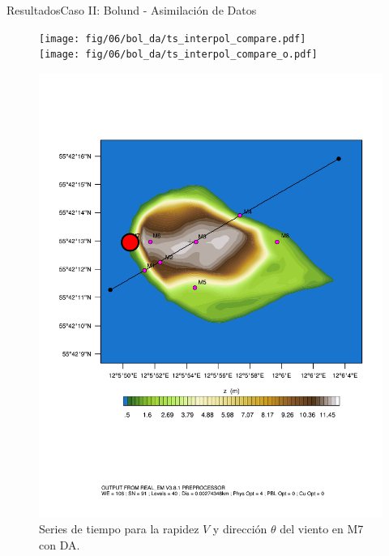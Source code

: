 \documentclass[mathserif,10pt]{beamer}
\begin{document}
\begin{frame}{Resultados}{Caso II: Bolund - Asimilación de Datos}
	\begin{figure}[H]
		\begin{minipage}{0.65\linewidth}
			\texttt{[image: fig/06/bol\_da/ts\_interpol\_compare.pdf]}\\%
			\texttt{[image: fig/06/bol\_da/ts\_interpol\_compare\_o.pdf]}%
		\end{minipage}%
		\begin{minipage}{0.35\linewidth}
			\centering
			\includegraphics[width=1\linewidth,page=1,trim={3.5cm 9.3cm 0.8cm 3.8cm},clip]{fig/05/ppt/bol_control_point7.pdf}%
		\end{minipage}%
		\vspace{-2mm}\caption{Series de tiempo para la rapidez $V$ y dirección $\theta$ del viento en M7 con DA.}
		\label{fig:06_bol_da_ts_m7}
	\end{figure}
\end{frame}
\end{document}
